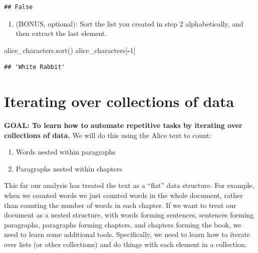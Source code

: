 \documentclass[
]{book}
\newenvironment{Shaded}{\begin{snugshade}}{\end{snugshade}}
\newcommand{\DecValTok}[1]{\textcolor[rgb]{0.00,0.00,0.81}{#1}}
\newcommand{\NormalTok}[1]{#1}
\newcommand{\OperatorTok}[1]{\textcolor[rgb]{0.81,0.36,0.00}{\textbf{#1}}}
\providecommand{\tightlist}{%
  \setlength{\itemsep}{0pt}\setlength{\parskip}{0pt}}
\begin{document}
\begin{alert}
\begin{verbatim}
## False
\end{verbatim}

\begin{enumerate}
\def\labelenumi{\arabic{enumi}.}
\setcounter{enumi}{3}
\tightlist
\item
  (BONUS, optional): Sort the list you created in step 2 alphabetically,
  and then extract the last element.
\end{enumerate}

\begin{Shaded}
\begin{Highlighting}[]
\NormalTok{alice\_characters.sort()}
\NormalTok{alice\_characters[}\OperatorTok{{-}}\DecValTok{1}\NormalTok{]}
\end{Highlighting}
\end{Shaded}

\begin{verbatim}
## 'White Rabbit'
\end{verbatim}

\end{alert}

\hypertarget{iterating-over-collections-of-data}{%
\section{Iterating over collections of data}\label{iterating-over-collections-of-data}}

\begin{alert}

\textbf{GOAL: To learn how to automate repetitive tasks by iterating over collections of data.} We will do this using the Alice text to count:

\begin{enumerate}
\def\labelenumi{\arabic{enumi}.}
\tightlist
\item
  Words nested within paragraphs
\item
  Paragraphs nested within chapters
\end{enumerate}

\end{alert}

This far our analysis has treated the text as a ``flat'' data structure. For example, when we counted words we just counted words in the whole document, rather than counting the number of words in each chapter. If we want to treat our document as a nested structure, with words forming sentences, sentences forming paragraphs, paragraphs forming chapters, and chapters forming the book, we need to learn some additional tools. Specifically, we need to learn how to iterate over lists (or other collections) and do things with each element in a collection.
\end{document}
